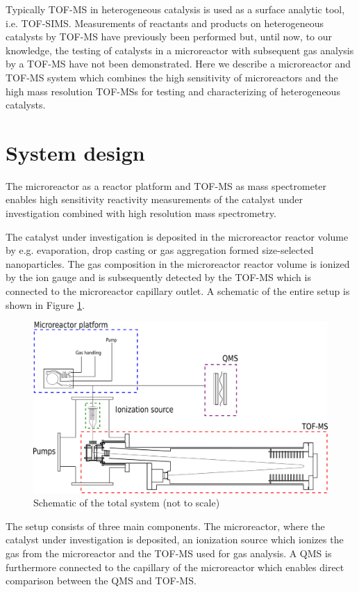 \documentclass[aip,rsi]{revtex4-1}
\begin{document}
Typically TOF-MS in heterogeneous catalysis is used as a surface analytic tool, i.e. TOF-SIMS\cite{Benninghoven1994,DeSmet1998,Grams2004,Johnson2010}. Measurements of reactants and products on heterogeneous catalysts by TOF-MS have previously been performed\cite{Levy1963,Okumura2007} but, until now, to our knowledge, the testing of catalysts in a microreactor with subsequent gas analysis by a TOF-MS have not been demonstrated. Here we describe a microreactor and TOF-MS system which combines the high sensitivity of microreactors and the high mass resolution TOF-MSs for testing and characterizing of heterogeneous catalysts.

\section{System design}
The microreactor as a reactor platform and TOF-MS as mass spectrometer enables high sensitivity reactivity measurements of the catalyst under investigation combined with high resolution mass spectrometry. 

The catalyst under investigation is deposited in the microreactor reactor volume by e.g. evaporation\cite{Henriksen2009}, drop casting\cite{Vesborg2010} or gas aggregation formed size-selected nanoparticles. The gas composition in the microreactor reactor volume is ionized by the ion gauge and is subsequently detected by the TOF-MS which is connected to the microreactor capillary outlet. A schematic of the entire setup is shown in Figure \ref{fig:TOF_microreactor}.
\begin{figure}
 \includegraphics[width=14cm]{TOF_microreactor.png}%
 \caption{Schematic of the total system (not to scale)\label{fig:TOF_microreactor}}%
\end{figure}
The setup consists of three main components. The microreactor, where the catalyst under investigation is deposited, an ionization source which ionizes the gas from the microreactor and the TOF-MS used for gas analysis. A QMS is furthermore connected to the capillary of the microreactor which enables direct comparison between the QMS and TOF-MS.
\end{document}
